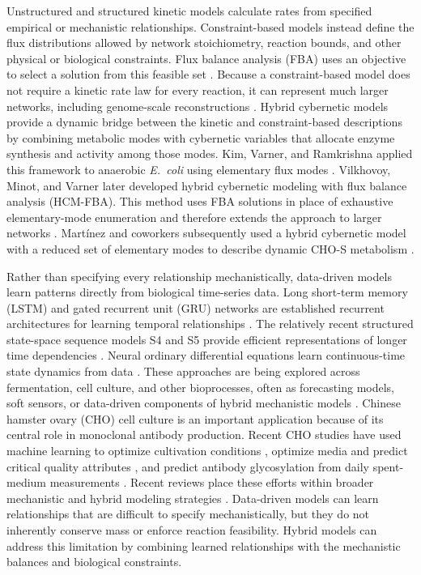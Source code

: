 Unstructured and structured kinetic models calculate rates from specified
empirical or mechanistic relationships. Constraint-based models instead
define the flux distributions allowed by network stoichiometry, reaction
bounds, and other physical or biological constraints. Flux balance analysis (FBA) uses an
objective to select a solution from this feasible set
\cite{Orth2010,Heirendt2019}. Because a constraint-based model does not require
a kinetic rate law for every reaction, it can represent much larger networks,
including genome-scale reconstructions \cite{Bordbar2014,AllenPalsson2003}.
Hybrid cybernetic models provide a dynamic bridge between the kinetic and
constraint-based descriptions by combining metabolic modes with cybernetic
variables that allocate enzyme synthesis and activity among those modes. Kim,
Varner, and Ramkrishna applied this framework to anaerobic \emph{E.~coli}
using elementary flux modes \cite{Kim2008}. Vilkhovoy, Minot, and Varner later
developed hybrid cybernetic modeling with flux balance analysis (HCM-FBA).
This method uses FBA solutions in place of exhaustive elementary-mode
enumeration and therefore extends the approach to larger networks
\cite{Vilkhovoy2016}.
Martínez and coworkers subsequently used a hybrid cybernetic model with a
reduced set of elementary modes to describe dynamic CHO-S metabolism
\cite{Martinez2020}.

Rather than specifying every relationship mechanistically, data-driven models
learn patterns directly from biological time-series data. Long short-term
memory (LSTM) and gated recurrent unit (GRU) networks
are established recurrent architectures for learning temporal relationships
\cite{Hochreiter1997,Cho2014}. The relatively recent structured state-space
sequence models S4 and S5 provide efficient representations of longer time
dependencies \cite{Gu2022,Smith2023}. Neural ordinary differential equations
learn continuous-time state dynamics from data \cite{Chen2018}.
These approaches are being explored across fermentation, cell culture, and
other bioprocesses, often as forecasting models, soft sensors, or data-driven
components of hybrid mechanistic models \cite{Mahanty2023}. Chinese hamster
ovary (CHO) cell culture is an important application because of its central
role in monoclonal antibody production. Recent CHO studies have used machine
learning to optimize cultivation conditions \cite{Richter2025}, optimize media
and predict critical quality attributes \cite{Gangwar2024}, and predict
antibody glycosylation from daily spent-medium measurements
\cite{Lakshmanan2024}. Recent reviews place these efforts within broader
mechanistic and hybrid modeling strategies \cite{GonzalezHernandez2024}.
Data-driven models can learn relationships that
are difficult to specify mechanistically, but they do not inherently conserve
mass or enforce reaction feasibility. Hybrid models can address this
limitation by combining learned relationships with the mechanistic balances
and biological constraints.

